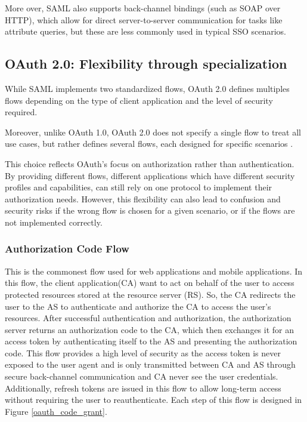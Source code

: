 \documentclass[../memoire.tex]{subfiles}
\begin{document}
More over, SAML also supports back-channel bindings (such as SOAP over HTTP), which allow for direct server-to-server communication for tasks like attribute queries, but these are less commonly used in typical SSO scenarios. 

\subsection{OAuth 2.0: Flexibility through specialization}

While SAML implements two standardized flows\cite{oasissaml}, OAuth 2.0 defines multiples flows\cite[p.~84]{siri2020} depending on the type of client application and the level of security required.

Moreover, unlike OAuth 1.0, OAuth 2.0 does not specify a single flow to treat all use cases, but rather defines several flows, each designed for specific scenarios \cite[p.~93]{richer2017}.

This choice reflects OAuth's focus on authorization rather than authentication. By providing different flows, different applications which have different security profiles and capabilities, can still rely on one protocol to implement their authorization needs. However, this flexibility can also lead to confusion and security risks if the wrong flow is chosen for a given scenario, or if the flows are not implemented correctly.

\subsubsection*{Authorization Code Flow}

This is the commonest flow used for web applications and mobile applications. In this flow, the client application(CA) want to act on behalf of the user to access protected resources stored at the resource server (RS). So, the CA redirects the user to the AS to authenticate and authorize the CA to access the user's resources. After successful authentication and authorization, the authorization server returns an authorization code to the CA, which then exchanges it for an access token by authenticating itself to the AS and presenting the authorization code. This flow provides a high level of security as the access token is never exposed to the user agent and is only transmitted between CA and AS through secure back-channel communication and CA never see the user credentials. Additionally, refresh tokens are issued in this flow to allow long-term access without requiring the user to reauthenticate. Each step of this flow is designed in Figure \ref{oauth_code_grant}.
\end{document}
